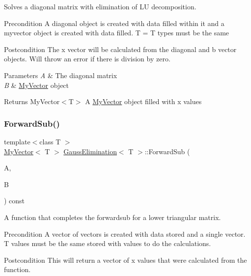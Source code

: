 Solves a diagonal matrix with elimination of LU decomposition. 

\begin{DoxyPrecond}{Precondition}
A diagonal object is created with data filled within it and a myvector object is created with data filled. T = T types must be the same 
\end{DoxyPrecond}
\begin{DoxyPostcond}{Postcondition}
The x vector will be calculated from the diagonal and b vector objects. Will throw an error if there is division by zero.
\end{DoxyPostcond}

\begin{DoxyParams}{Parameters}
{\em A} & The diagonal matrix \\
\hline
{\em B} & \mbox{\hyperlink{class_my_vector}{My\+Vector}} object \\
\hline
\end{DoxyParams}
\begin{DoxyReturn}{Returns}
My\+Vector$<$\+T$>$ A \mbox{\hyperlink{class_my_vector}{My\+Vector}} object filled with x values 
\end{DoxyReturn}
\mbox{\label{class_gauss_elimination_a2d069b26585ad8ec887bb496cd0076e7}} 
\subsubsection{\texorpdfstring{ForwardSub()}{ForwardSub()}}
{\footnotesize\ttfamily template$<$class T $>$ \\
\mbox{\hyperlink{class_my_vector}{My\+Vector}}$<$ T $>$ \mbox{\hyperlink{class_gauss_elimination}{Gauss\+Elimination}}$<$ T $>$\+::Forward\+Sub (\begin{DoxyParamCaption}\item[{const \mbox{\hyperlink{class_l_matrix}{L\+Matrix}}$<$ T $>$ \&}]{A,  }\item[{const \mbox{\hyperlink{class_my_vector}{My\+Vector}}$<$ T $>$ \&}]{B }\end{DoxyParamCaption}) const}



A function that completes the forwardsub for a lower triangular matrix. 

\begin{DoxyPrecond}{Precondition}
A vector of vectors is created with data stored and a single vector. T values must be the same stored with values to do the calculations. 
\end{DoxyPrecond}
\begin{DoxyPostcond}{Postcondition}
This will return a vector of x values that were calculated from the function.
\end{DoxyPostcond}


